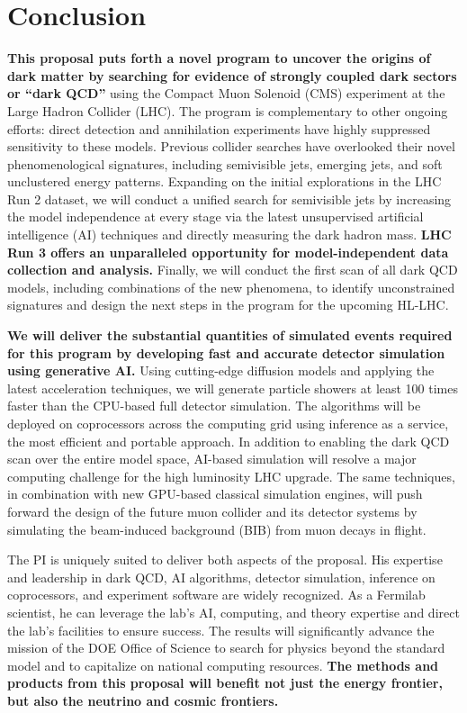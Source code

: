 \section{Conclusion}\label{sec:conclusion}

\textbf{This proposal puts forth a novel program to uncover the origins of dark matter
by searching for evidence of strongly coupled dark sectors or ``dark QCD''}
using the Compact Muon Solenoid (CMS) experiment at the Large Hadron Collider (LHC).
The program is complementary to other ongoing efforts:
direct detection and annihilation experiments have highly suppressed sensitivity to these models.
Previous collider searches have overlooked their novel phenomenological signatures,
including semivisible jets, emerging jets, and soft unclustered energy patterns.
Expanding on the initial explorations in the LHC Run 2 dataset,
we will conduct a unified search for semivisible jets by increasing the model independence at every stage
via the latest unsupervised artificial intelligence (AI) techniques and directly measuring the dark hadron mass.
\textbf{LHC Run 3 offers an unparalleled opportunity for model-independent data collection and analysis.}
Finally, we will conduct the first scan of all dark QCD models, including combinations of the new phenomena,
to identify unconstrained signatures and design the next steps in the program for the upcoming HL-LHC.

\textbf{We will deliver the substantial quantities of simulated events required for this program
by developing fast and accurate detector simulation using generative AI.}
Using cutting-edge diffusion models and applying the latest acceleration techniques,
we will generate particle showers at least 100 times faster than the CPU-based full detector simulation.
The algorithms will be deployed on coprocessors across the computing grid using inference as a service,
the most efficient and portable approach.
In addition to enabling the dark QCD scan over the entire model space,
AI-based simulation will resolve a major computing challenge for the high luminosity LHC upgrade.
The same techniques, in combination with new GPU-based classical simulation engines,
will push forward the design of the future muon collider and its detector systems
by simulating the beam-induced background (BIB) from muon decays in flight.

The PI is uniquely suited to deliver both aspects of the proposal.
His expertise and leadership in dark QCD, AI algorithms, detector simulation, inference on coprocessors, and experiment software are widely recognized.
As a Fermilab scientist, he can leverage the lab's AI, computing, and theory expertise and direct the lab's facilities to ensure success.
The results will significantly advance the mission of the DOE Office of Science to search for physics beyond the standard model and to capitalize on national computing resources.
\textbf{The methods and products from this proposal will benefit not just the energy frontier, but also the neutrino and cosmic frontiers.}

